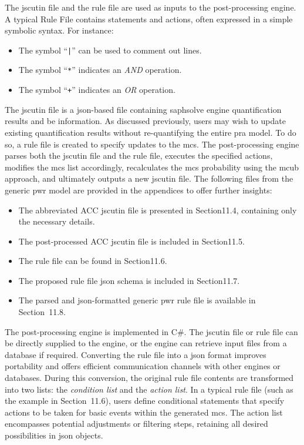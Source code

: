 The \acrshort{jscutin} file and the rule file are used as inputs to the post-processing engine. A typical Rule File contains statements and actions, often expressed in a simple symbolic syntax. For instance:
\begin{itemize}
    \item The symbol ``\texttt{|}'' can be used to comment out lines.
    \item The symbol ``\texttt{*}'' indicates an \emph{AND} operation.
    \item The symbol ``\texttt{+}'' indicates an \emph{OR} operation.
\end{itemize}
The \acrshort{jscutin} file is a \acrshort{json}-based file containing \acrshort{saphsolve} engine quantification results and \acrlong{be} information. As discussed previously, users may wish to update existing quantification results without re-quantifying the entire \acrshort{pra} model. To do so, a rule file is created to specify updates to the \acrshort{mcs}. The post-processing engine parses both the \acrshort{jscutin} file and the rule file, executes the specified actions, modifies the \acrshort{mcs} list accordingly, recalculates the \acrshort{mcs} probability using the \acrshort{mcub} approach, and ultimately outputs a new \acrshort{jscutin} file. The following files from the generic \acrshort{pwr} model \cite{Aras2024Generic} are provided in the appendices to offer further insights:

\begin{itemize}
\item The abbreviated ACC \acrshort{jscutin} file is presented in Section11.4, containing only the necessary details.
\item The post-processed ACC \acrshort{jscutin} file is included in Section11.5.
\item The rule file can be found in Section11.6.
\item The proposed rule file \acrshort{json} schema is included in Section11.7.
\item The parsed and \acrshort{json}-formatted generic \acrshort{pwr} rule file is available in Section~11.8.
\end{itemize}

The post-processing engine is implemented in C\#. The \acrshort{jscutin} file or rule file can be directly supplied to the engine, or the engine can retrieve input files from a database if required. Converting the rule file into a \acrshort{json} format improves portability and offers efficient communication channels with other engines or databases. During this conversion, the original rule file contents are transformed into two lists: the \emph{condition list} and the \emph{action list}. In a typical rule file (such as the example in Section~11.6), users define conditional statements that specify actions to be taken for basic events within the generated \acrshort{mcs}. The action list encompasses potential adjustments or filtering steps, retaining all desired possibilities in \acrshort{json} objects.

